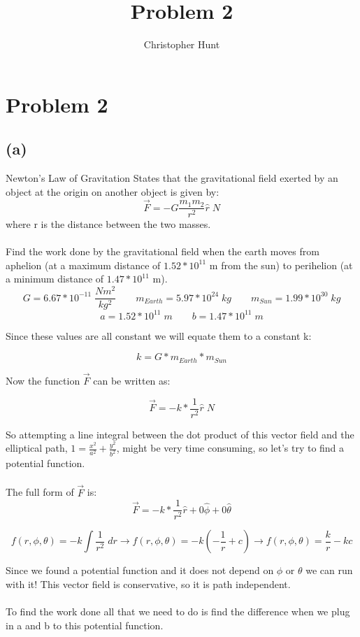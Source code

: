 \documentclass[11pt]{article}
\title{Problem 2}
\author{Christopher Hunt}
\date{}
\begin{document}
\pagestyle{fancy}
\fancyhf{}
\rhead{\thepage}
\maketitle

\section*{Problem 2}
\subsection*{(a)}
Newton's Law of Gravitation States that the gravitational field exerted by an object at the origin on another object is given by:
\begin{equation}
    \vec{F} = -G \frac{m_1m_2}{r^2}\hat{r}\;N
\end{equation}
where r is the distance between the two masses.
\\
\\
Find the work done by the gravitational field when the earth moves from aphelion (at a maximum distance of $1.52*10^{11}$ m from the sun) to perihelion (at a minimum distance of $1.47*10^{11}$ m).
$$G = 6.67 * 10^{−11} \; \frac{Nm^2}{kg^2}\qquad m_{Earth} = 5.97 * 10^{24} \;kg \qquad m_{Sun} = 1.99 * 10^{30}\;kg$$
$$a = 1.52*10^{11}\;m \qquad b = 1.47*10^{11}\;m$$

Since these values are all constant we will equate them to a constant k:

$$k = G*m_{Earth}*m_{Sun}$$

Now the function $\vec{F}$ can be written as:

$$\vec{F} = -k*\frac{1}{r^2}\hat{r}\;N$$

So attempting a line integral between the dot product of this vector field and the elliptical path, $1 = \frac{x^2}{a^2}+\frac{y^2}{b^2}$, might be very time consuming, so let's try to find a potential function.
\\
\\
The full form of $\vec{F}$ is:
$$\vec{F} = -k*\frac{1}{r^2}\hat{r} + 0\hat{\phi}+0\hat{\theta}$$

$$f(r,\phi,\theta) = -k \int \frac{1}{r^2} \; dr \rightarrow f(r,\phi,\theta) = -k \left( -\frac{1}{r}+c \right) \rightarrow f(r,\phi,\theta) = \frac{k}{r}-kc$$

Since we found a potential function and it does not depend on $\phi$ or $\theta$ we can run with it! This vector field is conservative, so it is path independent.
\\
\\
To find the work done all that we need to do is find the difference when we plug in a and b to this potential function.
\end{document}
